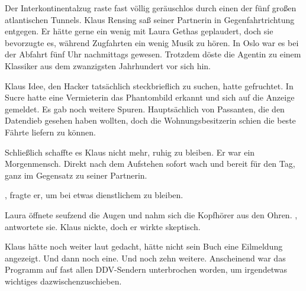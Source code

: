 Der Interkontinentalzug raste fast völlig geräuschlos durch einen der fünf großen atlantischen Tunnels. Klaus Rensing saß seiner Partnerin in Gegenfahrtrichtung entgegen. Er hätte gerne ein wenig mit Laura Gethas geplaudert, doch sie bevorzugte es, während Zugfahrten ein wenig Musik zu hören. In Oslo war es bei der Abfahrt fünf Uhr nachmittags gewesen. Trotzdem döste die Agentin zu einem Klassiker aus dem zwanzigsten Jahrhundert vor sich hin.

\par

Klaus Idee, den Hacker tatsächlich steckbrieflich zu suchen, hatte gefruchtet. In Sucre hatte eine Vermieterin das Phantombild erkannt und sich auf die Anzeige gemeldet. Es gab noch weitere Spuren. Hauptsächlich von Passanten, die den Datendieb gesehen haben wollten, doch die Wohnungsbesitzerin schien die beste Fährte liefern zu können.

\par

Schließlich schaffte es Klaus nicht mehr, ruhig zu bleiben. Er war ein Morgenmensch. Direkt nach dem Aufstehen sofort wach und bereit für den Tag, ganz im Gegensatz zu seiner Partnerin.

\par

, fragte er, um bei etwas dienstlichem zu bleiben.

\par

Laura öffnete seufzend die Augen und nahm sich die Kopfhörer aus den Ohren. , antwortete sie.  Klaus nickte, doch er wirkte skeptisch. 

\par


\par

Klaus hätte noch weiter laut gedacht, hätte nicht sein Buch eine Eilmeldung angezeigt. Und dann noch eine. Und noch zehn weitere. Anscheinend war das Programm auf fast allen DDV-Sendern unterbrochen worden, um irgendetwas wichtiges dazwischenzuschieben.

